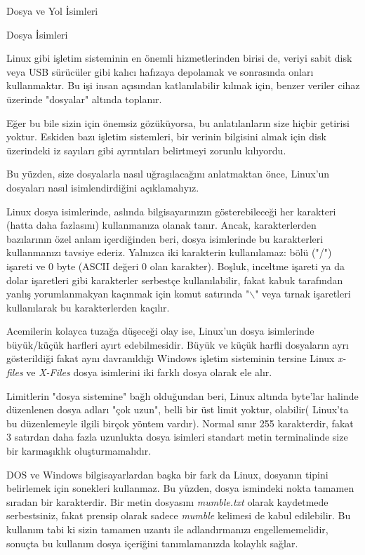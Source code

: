 \begin{section}{Dosya ve Yol İsimleri}
\begin{subsection}{Dosya İsimleri}

Linux gibi işletim sisteminin en önemli hizmetlerinden birisi de, veriyi sabit disk veya USB sürücüler gibi kalıcı hafızaya depolamak ve sonrasında onları kullanmaktır. Bu işi insan açısından katlanılabilir kılmak için, benzer veriler cihaz üzerinde "dosyalar" altında toplanır.

Eğer bu bile sizin için önemsiz gözüküyorsa, bu anlatılanların size hiçbir getirisi yoktur. Eskiden bazı işletim sistemleri, bir verinin bilgisini almak için disk üzerindeki iz sayıları gibi ayrıntıları belirtmeyi zorunlu kılıyordu. 

	Bu yüzden, size dosyalarla nasıl uğraşılacağını anlatmaktan önce, Linux'un dosyaları nasıl isimlendirdiğini açıklamalıyız.

	Linux dosya isimlerinde, aslında bilgisayarınızın gösterebileceği her karakteri (hatta daha fazlasını) kullanmanıza olanak tanır. Ancak, karakterlerden bazılarının özel anlam içerdiğinden beri, dosya isimlerinde bu karakterleri kullanmanızı tavsiye ederiz. Yalnızca iki karakterin kullanılamaz: bölü ("/") işareti ve 0 byte (ASCII değeri 0 olan karakter). Boşluk, inceltme işareti ya da dolar işaretleri gibi karakterler serbestçe kullanılabilir, fakat kabuk tarafından yanlış yorumlanmakyan kaçınmak için komut satırında "$\backslash$" veya tırnak işaretleri kullanılarak bu karakterlerden kaçılır.

	Acemilerin kolayca tuzağa düşeceği olay ise, Linux'un dosya isimlerinde büyük/küçük harfleri ayırt edebilmesidir. Büyük ve küçük harfli dosyaların ayrı gösterildiği fakat aynı davranıldığı Windows işletim sisteminin tersine Linux \emph{x-files} ve \emph{X-Files} dosya isimlerini iki farklı dosya olarak ele alır.

	Limitlerin "dosya sistemine" bağlı olduğundan beri, Linux altında byte'lar halinde düzenlenen dosya adları "çok uzun", belli bir üst limit yoktur, olabilir( Linux'ta  bu düzenlemeyle ilgili birçok yöntem vardır). Normal sınır 255 karakterdir, fakat 3 satırdan daha fazla uzunlukta dosya isimleri standart metin terminalinde size bir karmaşıklık oluşturmamalıdır.
	
	DOS ve Windows bilgisayarlardan başka bir fark da Linux, dosyanın tipini belirlemek için sonekleri kullanmaz. Bu yüzden, dosya ismindeki nokta tamamen sıradan bir karakterdir. Bir metin dosyasını \emph{mumble.txt} olarak kaydetmede serbestsiniz, fakat prensip olarak sadece \emph{mumble} kelimesi de  kabul edilebilir. Bu kullanım tabi ki sizin tamamen uzantı ile adlandırmanızı engellememelidir, sonuçta bu kullanım dosya içeriğini tanımlamanızda kolaylık sağlar.
	

\end{subsection}
\end{section}
